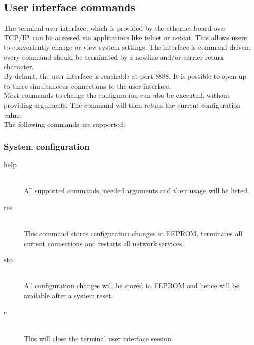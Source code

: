 \documentclass[a4paper]{scrreprt}
\begin{document}
\subsection{User interface commands}
\label{sec:uicmd}
The terminal user interface, which is provided by the ethernet board over TCP/IP, can be accessed via applications like telnet or netcat.
This allows users to conveniently change or view system settings. The interface is command driven, every command should be terminated
by a newline and/or carrier return character.\\
By default, the user interface is reachable at port 8888.
It is possible to open up to three simultaneous connections to the user interface.\\
Most commands to change the configuration can also be executed, without providing
arguments. The command will then return the current configuration value.\\
The following commands are supported:
\subsubsection{System configuration}
\begin{description}
  \item[help]\hspace{1cm}\\
    All supported commands, needed arguments and their usage will be listed.
  \item[res]\hspace{1cm}\\
    This command stores configuration changes to EEPROM, terminates all current connections and restarts all network
    services.
  \item[sto]\hspace{1cm}\\
    All configuration changes will be stored to EEPROM and hence will be available
    after a system reset.
  \item[c]\hspace{1cm}\\
    This will close the terminal user interface session.
\end{description}
\end{document}
